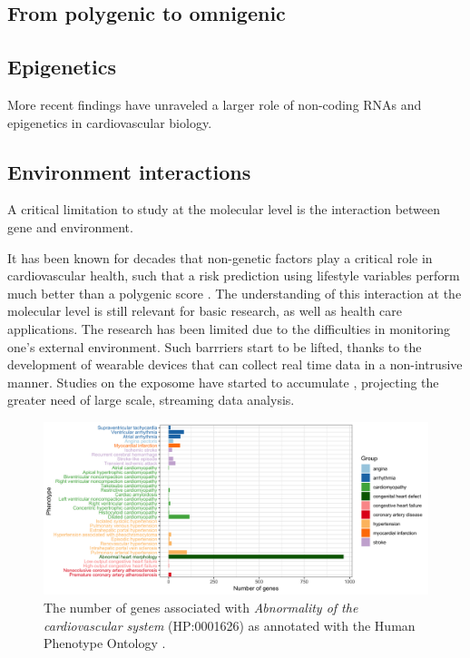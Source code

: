 \documentclass[letter]{bioinfo}
\begin{document}
\subsection{From polygenic to omnigenic}

\subsection{Epigenetics}

More recent findings have unraveled a larger role of non-coding RNAs and epigenetics in cardiovascular biology.

\subsection{Environment interactions}

A critical limitation to study at the molecular level is the interaction between gene  and environment.

It has been known for decades that non-genetic factors play a critical role in cardiovascular health, such that a risk prediction using lifestyle variables perform much better than a polygenic score \citep{Joyner:2011:Ten}. The understanding of this interaction at the molecular level is still relevant for basic research, as well as health care applications. The research has been limited due to the difficulties in monitoring one's external environment. Such barrriers start to be lifted, thanks to the development of wearable devices that can collect real time data in a non-intrusive manner. Studies on the exposome have started to accumulate \citep{Jiang:2018:Dynamic}, projecting the greater need of large scale, streaming data analysis.

\begin{figure}[!tpb]
	\includegraphics[width=1.\linewidth]{hpo-gene-count}
	\caption{The number of genes associated with \textit{Abnormality of the cardiovascular system} (HP:0001626) as annotated with the Human Phenotype Ontology \citep{Kohler:2014:Human}.}
	\label{fig:hpo_gene_count}	
\end{figure}
\end{document}
